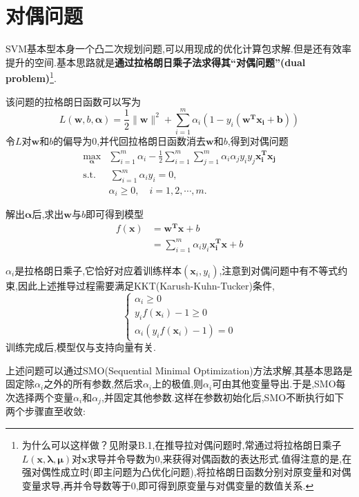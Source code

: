 \section{对偶问题}

SVM基本型本身一个凸二次规划问题,可以用现成的优化计算包求解.但是还有效率提升的空间.基本思路就是\textbf{通过拉格朗日乘子法求得其``对偶问题''(dual problem)}\footnote{为什么可以这样做？见附录B.1,在推导拉对偶问题时,常通过将拉格朗日乘子$L(\bm{x,\lambda,\mu})$对$\bm x$求导并令导数为$0$,来获得对偶函数的表达形式.值得注意的是,在强对偶性成立时(即主问题为凸优化问题),将拉格朗日函数分别对原变量和对偶变量求导,再并令导数等于$0$,即可得到原变量与对偶变量的数值关系.}.

该问题的拉格朗日函数可以写为
\begin{equation}L(\bm w, b, \bm\alpha)=\frac{1}{2}\|\bm w\|^2+\sum_{i=1}^m\alpha_i(1-y_i(\mathbf{w^Tx_i+b}))\end{equation}
令$L$对$\bm w$和$b$的偏导为$0$,并代回拉格朗日函数消去$\bm w$和$b$,得到对偶问题
\begin{equation}\begin{split}
\max_{\bm\alpha}&\sum_{i=1}^m\alpha_i-\frac{1}{2}\sum_{i=1}^m\sum_{j=1}^m\alpha_i\alpha_jy_iy_j\bm{x_i^Tx_j}\\
\text{s.t.}&\,\sum_{i=1}^m\alpha_iy_i=0,\\
&\alpha_i\ge 0,\quad i=1,2,\cdots,m.
\end{split}\end{equation}

解出$\bm\alpha$后,求出$\bm w$与$b$即可得到模型
\begin{equation}\begin{split}
f(\bm x)&=\bm{w^Tx}+b\\
&=\sum_{i=1}^m\alpha_iy_i\bm{x_i^Tx}+b
\end{split}\end{equation}

$\alpha_i$是拉格朗日乘子,它恰好对应着训练样本$(\bm x_i,y_i)$,注意到对偶问题中有不等式约束,因此上述推导过程需要满足KKT(Karush-Kuhn-Tucker)条件,
\begin{equation}\left\{\begin{array}{ll}
\alpha_i\ge 0\\
y_if(\bm x_i)-1\ge 0\\
\alpha_i(y_if(\bm x_i)-1)=0
\end{array}\right.\end{equation}
训练完成后,模型仅与支持向量有关.

上述问题可以通过SMO(Sequential Minimal Optimization)方法求解,其基本思路是固定除$\alpha_i$之外的所有参数,然后求$\alpha_i$上的极值,则$\alpha_i$可由其他变量导出.于是,SMO每次选择两个变量$\alpha_i$和$\alpha_j$,并固定其他参数.这样在参数初始化后,SMO不断执行如下两个步骤直至收敛:

